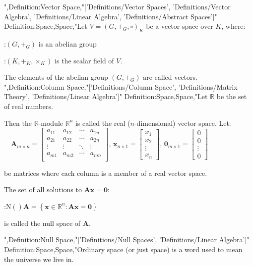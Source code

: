 ",Definition:Vector Space,"['Definitions/Vector Spaces', 'Definitions/Vector Algebra', 'Definitions/Linear Algebra', 'Definitions/Abstract Spaces']"
Definition:Space,Space,"Let $V = \left( G, +_G, \circ \right)_K$ be a vector space over $K$, where:

:$\left( G, +_G \right)$ is an abelian group

:$\left( K, +_K, \times_K \right)$ is the scalar field of $V$.


The elements of the abelian group $\left( G, +_G \right)$ are called vectors.
",Definition:Column Space,"['Definitions/Column Space', 'Definitions/Matrix Theory', 'Definitions/Linear Algebra']"
Definition:Space,Space,"Let $\mathbb R$ be the set of real numbers.


Then the $\mathbb R$-module $\mathbb R^n$ is called the real ($n$-dimensional) vector space.
Let:
$\quad \mathbf A_{m \times n} = \begin {bmatrix}
a_{11} & a_{12} & \cdots & a_{1n} \\
a_{21} & a_{22} & \cdots & a_{2n} \\
\vdots & \vdots & \ddots & \vdots \\
a_{m1} & a_{m2} & \cdots & a_{mn} \\
\end {bmatrix}$,  $\mathbf x_{n \times 1} = \begin {bmatrix} x_1 \\ x_2 \\ \vdots \\ x_n \end {bmatrix}$, $\mathbf 0_{m \times 1} = \begin {bmatrix} 0 \\ 0 \\ \vdots \\ 0 \end {bmatrix}$

be matrices where each column is a member of a real vector space.

The set of all solutions to $\mathbf A \mathbf x = \mathbf 0$:

:$\mathrm N \left(   \right){\mathbf A} = \left\lbrace \mathbf x \in \mathbb R^n : \mathbf {A x} = \mathbf 0 \right\rbrace$

is called the null space of $\mathbf A$.



",Definition:Null Space,"['Definitions/Null Spaces', 'Definitions/Linear Algebra']"
Definition:Space,Space,"Ordinary space (or just space) is a word used to mean the universe we live in.

